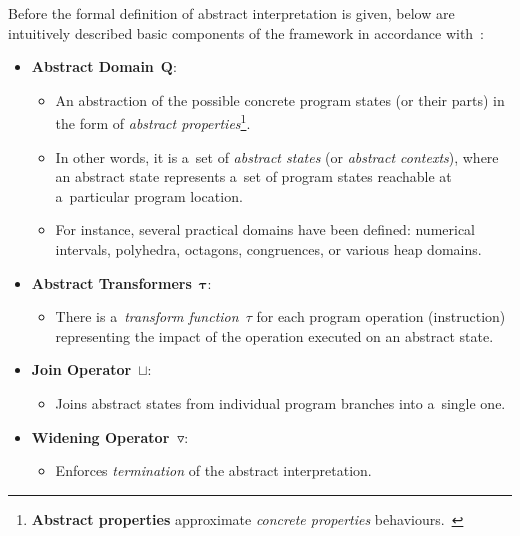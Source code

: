 Before the formal definition of abstract interpretation is given, below are intuitively described basic components of the framework in accordance with~\cite{AICousotWeb, AIBasedFormalMethodsCousot, savAI, programAnalysisNielson}:
\begin{itemize}
    \item \textbf{Abstract Domain}~$ \boldsymbol{Q} $:
        \begin{itemize}
            \item An abstraction of the possible concrete program states (or their parts) in the form of \emph{abstract properties}\footnote{\textbf{Abstract properties} approximate \emph{concrete properties} behaviours.~\cite{AIBasedFormalMethodsCousot}}.
                
            \item In other words, it is a~set of \emph{abstract states} (or \emph{abstract contexts}), where an abstract state represents a~set of program states reachable at a~particular program location.
            
            \item For instance, several practical domains have been defined: numerical intervals, polyhedra, octagons, congruences, or various heap domains.
        \end{itemize}

    \item \textbf{Abstract Transformers}~$ \boldsymbol{\tau} $:
        \begin{itemize}
            \item There is a~\emph{transform function}~$ \tau $ for each program operation (instruction) representing the impact of the operation executed on an abstract state.
        \end{itemize}

    \item \textbf{Join Operator}~$ \boldsymbol{\sqcup} $:
        \begin{itemize}
            \item Joins abstract states from individual program branches into a~single one.
        \end{itemize}

    \item \textbf{Widening Operator~$ \boldsymbol{\triangledown} $}:
        \begin{itemize}
            \item Enforces \emph{termination} of the abstract interpretation.


\end{itemize}
\end{itemize}
